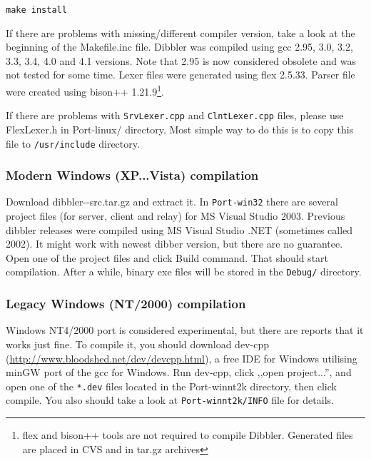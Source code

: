 \begin{verbatim}
make install
\end{verbatim}

If there are problems with missing/different compiler
version, take a look at the beginning of the Makefile.inc
file. Dibbler was compiled using gcc 2.95, 3.0, 3.2, 3.3, 3.4, 4.0 and 4.1
versions. Note that 2.95 is now considered obsolete and was not tested
for some time. Lexer files were generated using flex 2.5.33. Parser file
were created using bison++ 1.21.9\footnote{flex and bison++ tools are
  not required to compile Dibbler. Generated files are placed in CVS
  and in tar.gz archives}. 

If there are problems with \verb+SrvLexer.cpp+ and
\verb+ClntLexer.cpp+ files, please use FlexLexer.h in Port-linux/
directory. Most simple way to do this is to copy this file to
\verb+/usr/include+ directory. 

\subsubsection{Modern Windows (XP...Vista) compilation}
Download dibbler-\version-src.tar.gz and extract it. In \verb+Port-win32+ there
are several project files (for server, client and relay) for MS
Visual Studio 2003. Previous dibbler releases were compiled using MS
Visual Studio .NET (sometimes called 2002). It might work with newest
dibber version, but there are no guarantee. Open one of the project
files and click Build command. That should start compilation. After a
while, binary exe files will be stored in the \verb+Debug/+ directory.

\subsubsection{Legacy Windows (NT/2000) compilation}
Windows NT4/2000 port is considered experimental, but there are reports
that it works just fine. To compile it, you should download dev-cpp
(\url{http://www.bloodshed.net/dev/devcpp.html}), a free IDE for
Windows utilising minGW port of the gcc for Windows. Run dev-cpp,
click ,,open project...'', and open one of the \verb+*.dev+ files located
in the Port-winnt2k directory, then click compile. You also should
take a look at \verb+Port-winnt2k/INFO+ file for details.

